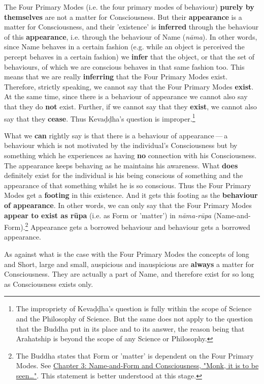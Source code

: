 \label{the-four-primary}The Four Primary Modes (i.e. the four primary modes of behaviour)
\textbf{purely by themselves} are not a matter for Consciousness. But their
\textbf{appearance} is a matter for Consciousness, and their 'existence' is
\textbf{inferred} through the behaviour of this \textbf{appearance}, i.e. through
the behaviour of Name (\emph{nāma}). In other words, since Name behaves in
a certain fashion (e.g. while an object is perceived the percept behaves
in a certain fashion) we \textbf{infer} that the object, or that the set of
behaviours, of which we are conscious behaves in that same fashion too.
This means that we are really \textbf{inferring} that the Four Primary Modes
exist. Therefore, strictly speaking, we cannot say that the Four Primary
Modes \textbf{exist}. At the same time, since there is a behaviour of
appearance we cannot also say that they do \textbf{not} exist. Further, if we
cannot say that they \textbf{exist}, we cannot also say that they \textbf{cease}.
Thus Kevaḍḍha’s question is improper.\footnote{The impropriety of Kevaḍḍha’s question is fully within the scope of Science and the Philosophy of Science. But the same does not apply to the question that the Buddha put in its place and to its answer, the reason being that Arahatship is beyond the scope of any Science or Philosophy.}


What we \textbf{can} rightly say is that there is a behaviour of appearance — a
behaviour which is not motivated by the individual’s Consciousness but
by something which he experiences as having \textbf{no} connection with his
Consciousness. The appearance keeps behaving as he maintains his
awareness. What \textbf{does} definitely exist for the individual is his being
conscious of something and the appearance of that something whilst he is
so conscious. Thus the Four Primary Modes get a \textbf{footing} in this
existence. And it gets this footing as the \textbf{behaviour of appearance}.
In other words, we can only say that the Four Primary Modes \textbf{appear to exist as rūpa}
(i.e. as Form or 'matter') in \emph{nāma-rūpa}
(Name-and-Form).\footnote{The Buddha states that Form or 'matter' is dependent on the Four Primary Modes. See \hyperlink{ch-03-name-and-form-and-consciousness#dependent}{Chapter 3: Name-and-Form and Consciousness, "Monk, it is to be seen…​"}. This statement is better understood at this stage.} Appearance gets a borrowed behaviour
and behaviour gets a borrowed appearance.


As against what is the case with the Four Primary Modes the concepts of
long and Short, large and small, auspicious and inauspicious are
\textbf{always} a matter for Consciousness. They are actually a part of Name,
and therefore exist for so long as Consciousness exists only.


